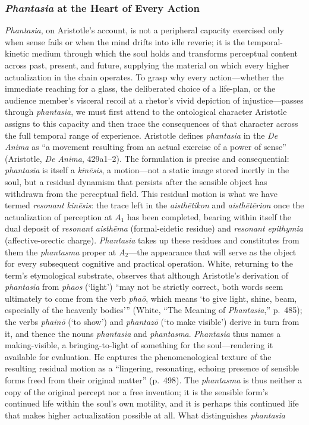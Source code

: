 \documentclass{article}
\begin{document}

\subsubsection*{\textit{Phantasia} at the Heart of Every Action}

\textit{Phantasia}, on Aristotle's account, is not a peripheral capacity exercised only when sense fails or when the mind drifts into idle reverie; it is the temporal-kinetic medium through which the soul holds and transforms perceptual content across past, present, and future, supplying the material on which every higher actualization in the chain operates. To grasp why every action---whether the immediate reaching for a glass, the deliberated choice of a life-plan, or the audience member's visceral recoil at a rhetor's vivid depiction of injustice---passes through \textit{phantasia}, we must first attend to the ontological character Aristotle assigns to this capacity and then trace the consequences of that character across the full temporal range of experience. Aristotle defines \textit{phantasia} in the \textit{De Anima} as ``a movement resulting from an actual exercise of a power of sense'' (Aristotle, \textit{De Anima}, 429a1--2). The formulation is precise and consequential: \textit{phantasia} is itself a \textit{kin\={e}sis}, a motion---not a static image stored inertly in the soul, but a residual dynamism that persists after the sensible object has withdrawn from the perceptual field. This residual motion is what we have termed \textit{resonant kin\={e}sis}: the trace left in the \textit{aisth\={e}tikon} and \textit{aisth\={e}t\={e}rion} once the actualization of perception at $A_1$ has been completed, bearing within itself the dual deposit of \textit{resonant aisth\={e}ma} (formal-eidetic residue) and \textit{resonant epithymia} (affective-orectic charge). \textit{Phantasia} takes up these residues and constitutes from them the \textit{phantasma} proper at $A_2$---the appearance that will serve as the object for every subsequent cognitive and practical operation. White, returning to the term's etymological substrate, observes that although Aristotle's derivation of \textit{phantasia} from \textit{phaos} (`light') ``may not be strictly correct, both words seem ultimately to come from the verb \textit{phaō}, which means `to give light, shine, beam, especially of the heavenly bodies''' (White, ``The Meaning of \textit{Phantasia},'' p.~485); the verbs \textit{phainō} (`to show') and \textit{phantazō} (`to make visible') derive in turn from it, and thence the nouns \textit{phantasia} and \textit{phantasma}. \textit{Phantasia} thus names a making-visible, a bringing-to-light of something for the soul---rendering it available for evaluation. He captures the phenomenological texture of the resulting residual motion as a ``lingering, resonating, echoing presence of sensible forms freed from their original matter'' (p.~498). The \textit{phantasma} is thus neither a copy of the original percept nor a free invention; it is the sensible form's continued life within the soul's own motility, and it is perhaps this continued life that makes higher actualization possible at all. What distinguishes \textit{phantasia} 
\end{document}
